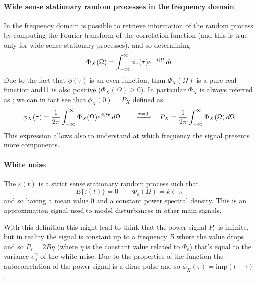 	\paragraph{Wide sense stationary random processes in the frequency domain} In the frequency domain is possible to retrieve information of the random process by computing the Fourier transform of the correlation function (and this is true only for wide sense stationary processes), and so determining
	\[ \Phi_X(\Omega) = \int_{-\infty}^\infty \phi_x(\tau) e^{-j\Omega t}\, dt \] 
	Due to the fact that $\phi(\tau)$ is an even function, than $\Phi_X(\Omega)$ is a pure real function and11 is also positive ($\Phi_X(\Omega) \geq 0$). In particular $\Phi_X$ is always referred as ; we can in fact see that $\phi_X(0) = P_X$ defined as
	\[ \phi_X(\tau)= \frac 1 {2\pi} \int_{-\infty}^\infty \Phi_X(\Omega) e^{j\Omega \tau} \, d\Omega \qquad \xrightarrow{\tau = 0} \quad P_X = \frac 1 {2\pi} \int_{-\infty}^\infty \Phi_X(\Omega) \, d\Omega \]
	This expression allows also to understand at which frequency the signal presents more components.
	
	\paragraph{White noise}  The  $\varepsilon(t)$ is a strict sense stationary random process such that 
	\[ E\{ \varepsilon(t) \} = 0 \qquad \Phi_\varepsilon(\Omega) = k \in \mathds R \]
	and so having a mean value 0 and a constant power spectral density. This is an approximation signal used to model disturbances in other main signals. 
	
	With this definition this might lead to think that the power signal $P_\varepsilon$ is infinite, but in reality the signal is constant up to a frequency $B$ where the value drops and so $P_\varepsilon = 2B \eta$ (where $\eta$ is the constant value related to $\Phi_\varepsilon$) that's equal to the variance $\sigma_\varepsilon^2$ of the white noise. Due to the properties of the function the autocorrelation of the power signal is a dirac pulse and so $\phi_X(\tau) = \textrm{imp}(t-\tau)$.
	
	
	
	
	
	
	
	
	
	
	
	
	
	
	
	
	
	
	
	
	
	
	
	
	
	
	
	
	